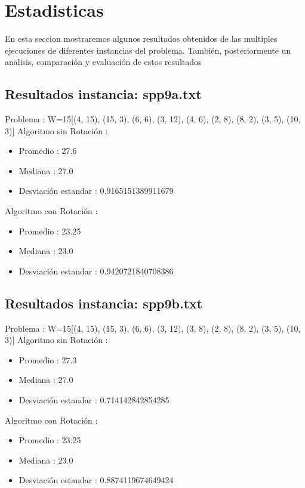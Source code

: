 \documentclass{article}%
\begin{document}
%
\normalsize%
\section{Estadisticas}%
\label{sec:Estadisticas}%
En esta seccion mostraremos algunos resultados obtenidos de las multiples ejecuciones de diferentes instancias del problema.%
También, posteriormente un analisis, comparación y evaluación de estos resultados%
\subsection{Resultados instancia: spp9a.txt}%
\label{subsec:Resultadosinstanciaspp9a.txt}%
Problema : W=15{[}(4, 15), (15, 3), (6, 6), (3, 12), (4, 6), (2, 8), (8, 2), (3, 5), (10, 3){]} \newline%
%
 Algoritmo sin Rotación : %
\begin{itemize}%
\item%
Promedio : 27.6%
\item%
Mediana : 27.0%
\item%
Desviación estandar : 0.9165151389911679%
\end{itemize}

%
Algoritmo con Rotación : %
\begin{itemize}%
\item%
Promedio : 23.25%
\item%
Mediana : 23.0%
\item%
Desviación estandar : 0.9420721840708386%
\end{itemize}%
\subsection{Resultados instancia: spp9b.txt}%
\label{subsec:Resultadosinstanciaspp9b.txt}%
Problema : W=15{[}(4, 15), (15, 3), (6, 6), (3, 12), (3, 8), (2, 8), (8, 2), (3, 5), (10, 3){]} \newline%
%
 Algoritmo sin Rotación : %
\begin{itemize}%
\item%
Promedio : 27.3%
\item%
Mediana : 27.0%
\item%
Desviación estandar : 0.714142842854285%
\end{itemize}

%
Algoritmo con Rotación : %
\begin{itemize}%
\item%
Promedio : 23.25%
\item%
Mediana : 23.0%
\item%
Desviación estandar : 0.8874119674649424%
\end{itemize}%
\end{document}
